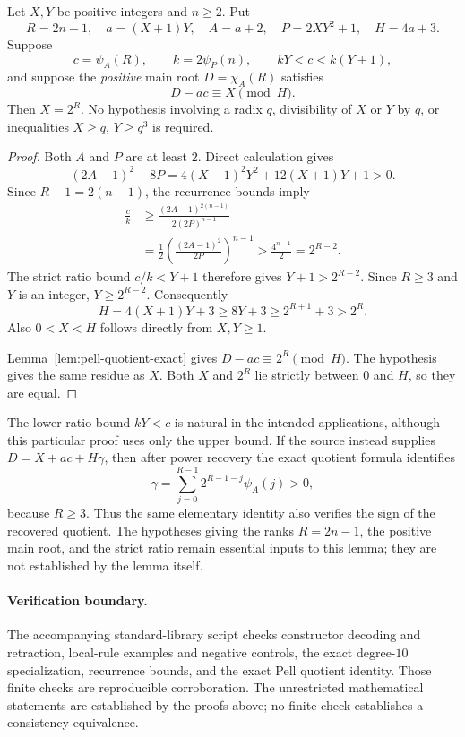 \begin{auxsyntaxthm}
\label{thm:pell-power-recovery-clean}
Let $X,Y$ be positive integers and $n\ge2$.  Put
\[
 R=2n-1,\quad a=(X+1)Y,\quad A=a+2,\quad
 P=2XY^2+1,\quad H=4a+3.
\]
Suppose
\[
 c=\psi_A(R),\qquad k=2\psi_P(n),\qquad
 kY<c<k(Y+1),
\]
and suppose the \emph{positive} main root
$D=\chi_A(R)$ satisfies
\[
 D-ac\equiv X\pmod H.
\]
Then $X=2^R$.  No hypothesis involving a radix $q$, divisibility of $X$
or $Y$ by $q$, or inequalities $X\ge q$, $Y\ge q^3$ is required.
\end{auxsyntaxthm}
\begin{proof}
Both $A$ and $P$ are at least $2$.  Direct calculation gives
\[
 (2A-1)^2-8P
 =4(X-1)^2Y^2+12(X+1)Y+1>0.
\]
Since $R-1=2(n-1)$, the recurrence bounds imply
\begin{align*}
 \frac ck
 &\ge \frac{(2A-1)^{2(n-1)}}{2(2P)^{n-1}}\\
 &=\frac12\left(\frac{(2A-1)^2}{2P}\right)^{n-1}
 >\frac{4^{n-1}}2=2^{R-2}.
\end{align*}
The strict ratio bound $c/k<Y+1$ therefore gives
$Y+1>2^{R-2}$.  Since $R\ge3$ and $Y$ is an integer,
$Y\ge2^{R-2}$.  Consequently
\[
 H=4(X+1)Y+3\ge8Y+3\ge2^{R+1}+3>2^R.
\]
Also $0<X<H$ follows directly from $X,Y\ge1$.

Lemma~\ref{lem:pell-quotient-exact} gives
$D-ac\equiv2^R\pmod H$.  The hypothesis gives the same residue as $X$.
Both $X$ and $2^R$ lie strictly between $0$ and $H$, so they are equal.
\end{proof}

The lower ratio bound $kY<c$ is natural in the intended applications,
although this particular proof uses only the upper bound.  If the source
instead supplies $D=X+ac+H\gamma$, then after power recovery the exact
quotient formula identifies
\[
 \gamma=\sum_{j=0}^{R-1}2^{R-1-j}\psi_A(j)>0,
\]
because $R\ge3$.  Thus the same elementary identity also verifies the
sign of the recovered quotient.  The hypotheses giving the ranks
$R=2n-1$, the positive main root, and the strict ratio remain essential
inputs to this lemma; they are not established by the lemma itself.

\paragraph{Verification boundary.}
The accompanying standard-library script checks constructor decoding and
retraction, local-rule examples and negative controls, the exact
degree-$10$ specialization, recurrence bounds, and the exact Pell
quotient identity.  Those finite checks are reproducible corroboration.
The unrestricted mathematical statements are established by the proofs
above; no finite check establishes a consistency equivalence.
